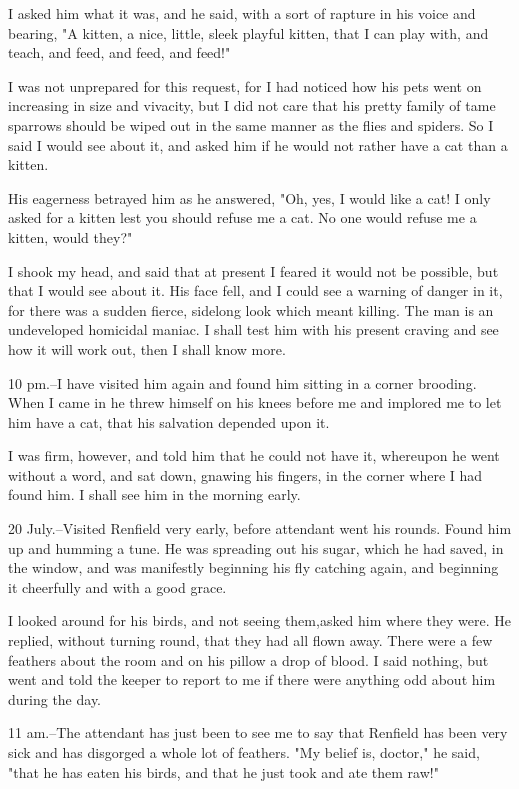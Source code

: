 I asked him what it was, and he said, with a sort of rapture in his voice and bearing, "A kitten, a nice, little, sleek playful kitten, that I can play with, and teach, and feed, and feed, and feed!" 

I was not unprepared for this request, for I had noticed how his pets went on increasing in size and vivacity, but I did not care that his pretty family of tame sparrows should be wiped out in the same manner as the flies and spiders. So I said I would see about it, and asked him if he would not rather have a cat than a kitten. 

His eagerness betrayed him as he answered, "Oh, yes, I would like a cat! I only asked for a kitten lest you should refuse me a cat. No one would refuse me a kitten, would they?" 

I shook my head, and said that at present I feared it would not be possible, but that I would see about it. His face fell, and I could see a warning of danger in it, for there was a sudden fierce, sidelong look which meant killing. The man is an undeveloped homicidal maniac. I shall test him with his present craving and see how it will work out, then I shall know more. 

10 pm.--I have visited him again and found him sitting in a corner brooding. When I came in he threw himself on his knees before me and implored me to let him have a cat, that his salvation depended upon it. 

I was firm, however, and told him that he could not have it, whereupon he went without a word, and sat down, gnawing his fingers, in the corner where I had found him. I shall see him in the morning early. 

20 July.--Visited Renfield very early, before attendant went his rounds. Found him up and humming a tune. He was spreading out his sugar, which he had saved, in the window, and was manifestly beginning his fly catching again, and beginning it cheerfully and with a good grace. 

I looked around for his birds, and not seeing them,asked him where they were. He replied, without turning round, that they had all flown away. There were a few feathers about the room and on his pillow a drop of blood. I said nothing, but went and told the keeper to report to me if there were anything odd about him during the day. 

11 am.--The attendant has just been to see me to say that Renfield has been very sick and has disgorged a whole lot of feathers. "My belief is, doctor," he said, "that he has eaten his birds, and that he just took and ate them raw!" 

